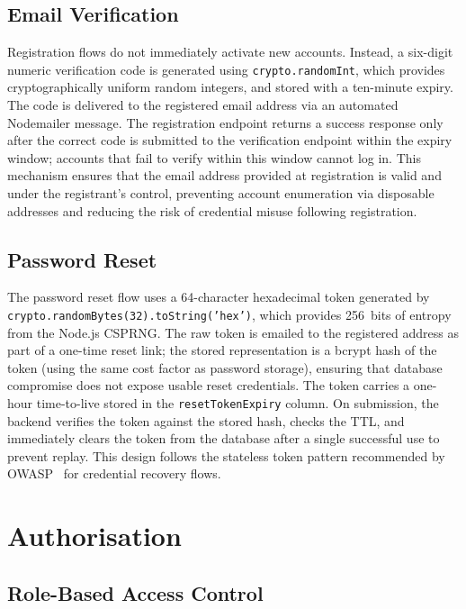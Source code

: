 \subsection{Email Verification}

Registration flows do not immediately activate new accounts. Instead, a
six-digit numeric verification code is generated using
\texttt{crypto.randomInt}, which provides cryptographically uniform random
integers, and stored with a ten-minute expiry. The code is delivered to the
registered email address via an automated Nodemailer message. The
registration endpoint returns a success response only after the correct code
is submitted to the verification endpoint within the expiry window; accounts
that fail to verify within this window cannot log in. This mechanism ensures
that the email address provided at registration is valid and under the
registrant's control, preventing account enumeration via disposable addresses
and reducing the risk of credential misuse following registration.

\subsection{Password Reset}

The password reset flow uses a 64-character hexadecimal token generated by
\texttt{crypto.randomBytes(32).toString('hex')}, which provides 256~bits of
entropy from the Node.js CSPRNG. The raw token is emailed to the registered
address as part of a one-time reset link; the stored representation is a
bcrypt hash of the token (using the same cost factor as password storage),
ensuring that database compromise does not expose usable reset credentials.
The token carries a one-hour time-to-live stored in the
\texttt{resetTokenExpiry} column. On submission, the backend verifies the
token against the stored hash, checks the TTL, and immediately clears the
token from the database after a single successful use to prevent replay.
This design follows the stateless token pattern recommended by
OWASP~\cite{owasp2021} for credential recovery flows.

\section{Authorisation}
\label{sec:authz}

\subsection{Role-Based Access Control}

